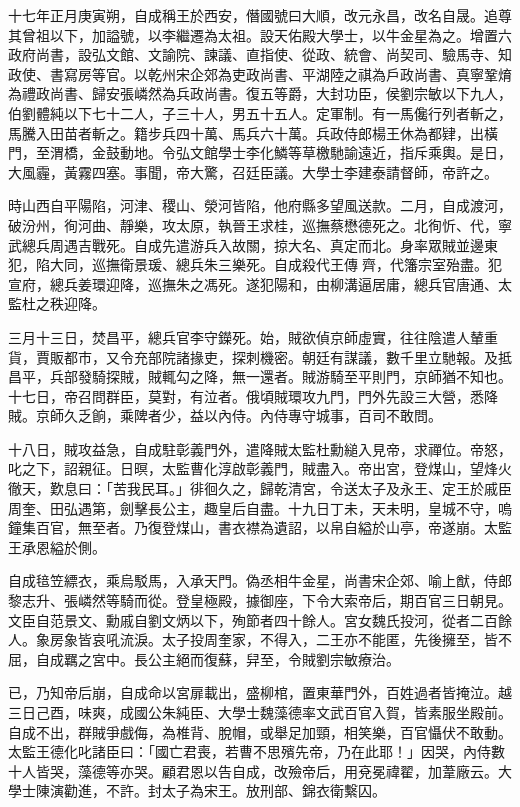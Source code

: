 \begin{pinyinscope}
十七年正月庚寅朔，自成稱王於西安，僭國號曰大順，改元永昌，改名自晟。追尊其曾祖以下，加謚號，以李繼遷為太祖。設天佑殿大學士，以牛金星為之。增置六政府尚書，設弘文館、文諭院、諫議、直指使、從政、統會、尚契司、驗馬寺、知政使、書寫房等官。以乾州宋企郊為吏政尚書、平湖陸之祺為戶政尚書、真寧鞏焴為禮政尚書、歸安張嶙然為兵政尚書。復五等爵，大封功臣，侯劉宗敏以下九人，伯劉體純以下七十二人，子三十人，男五十五人。定軍制。有一馬儳行列者斬之，馬騰入田苗者斬之。籍步兵四十萬、馬兵六十萬。兵政侍郎楊王休為都肄，出橫門，至渭橋，金鼓動地。令弘文館學士李化鱗等草檄馳諭遠近，指斥乘輿。是日，大風霾，黃霧四塞。事聞，帝大驚，召廷臣議。大學士李建泰請督師，帝許之。

時山西自平陽陷，河津、稷山、滎河皆陷，他府縣多望風送款。二月，自成渡河，破汾州，徇河曲、靜樂，攻太原，執晉王求桂，巡撫蔡懋德死之。北徇忻、代，寧武總兵周遇吉戰死。自成先遣游兵入故關，掠大名、真定而北。身率眾賊並邊東犯，陷大同，巡撫衛景瑗、總兵朱三樂死。自成殺代王傳齊，代籓宗室殆盡。犯宣府，總兵姜環迎降，巡撫朱之馮死。遂犯陽和，由柳溝逼居庸，總兵官唐通、太監杜之秩迎降。

三月十三日，焚昌平，總兵官李守鑅死。始，賊欲偵京師虛實，往往陰遣人輦重貨，賈販都市，又令充部院諸掾吏，探刺機密。朝廷有謀議，數千里立馳報。及抵昌平，兵部發騎探賊，賊輒勾之降，無一還者。賊游騎至平則門，京師猶不知也。十七日，帝召問群臣，莫對，有泣者。俄頃賊環攻九門，門外先設三大營，悉降賊。京師久乏餉，乘陴者少，益以內侍。內侍專守城事，百司不敢問。

十八日，賊攻益急，自成駐彰義門外，遣降賊太監杜勳縋入見帝，求禪位。帝怒，叱之下，詔親征。日暝，太監曹化淳啟彰義門，賊盡入。帝出宮，登煤山，望烽火徹天，歎息曰：「苦我民耳。」徘徊久之，歸乾清宮，令送太子及永王、定王於戚臣周奎、田弘遇第，劍擊長公主，趣皇后自盡。十九日丁未，天未明，皇城不守，嗚鐘集百官，無至者。乃復登煤山，書衣襟為遺詔，以帛自縊於山亭，帝遂崩。太監王承恩縊於側。

自成毰笠縹衣，乘烏駁馬，入承天門。偽丞相牛金星，尚書宋企郊、喻上猷，侍郎黎志升、張嶙然等騎而從。登皇極殿，據御座，下令大索帝后，期百官三日朝見。文臣自范景文、勳戚自劉文炳以下，殉節者四十餘人。宮女魏氏投河，從者二百餘人。象房象皆哀吼流淚。太子投周奎家，不得入，二王亦不能匿，先後擁至，皆不屈，自成羈之宮中。長公主絕而復蘇，舁至，令賊劉宗敏療治。

已，乃知帝后崩，自成命以宮扉載出，盛柳棺，置東華門外，百姓過者皆掩泣。越三日己酉，味爽，成國公朱純臣、大學士魏藻德率文武百官入賀，皆素服坐殿前。自成不出，群賊爭戲侮，為椎背、脫帽，或舉足加頸，相笑樂，百官懾伏不敢動。太監王德化叱諸臣曰：「國亡君喪，若曹不思殯先帝，乃在此耶！」因哭，內侍數十人皆哭，藻德等亦哭。顧君恩以告自成，改殮帝后，用兗冕禕翟，加葦廠云。大學士陳演勸進，不許。封太子為宋王。放刑部、錦衣衛繫囚。


\end{pinyinscope}
